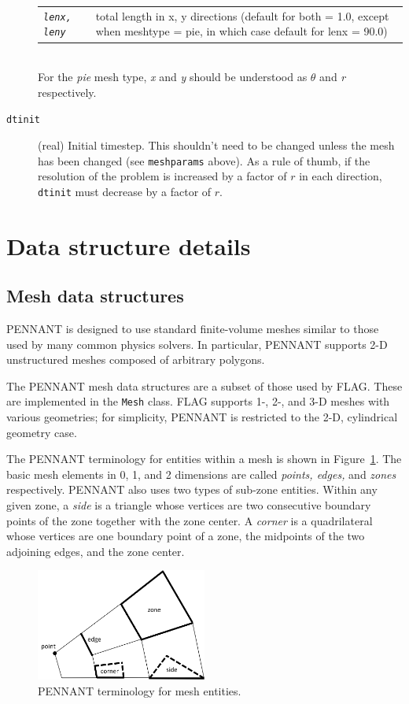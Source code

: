 \documentclass[11pt,letterpaper]{article}
\begin{document}
\begin{description}
\begin{tabular}{lp{320pt}}
            {\tt\emph{lenx, leny}} &
            total length in x, y directions
            (default for both = 1.0, except when meshtype = pie,
            in which case default for lenx = 90.0)
        \end{tabular} \\
        For the {\em pie} mesh type, {\em x} and {\em y}
        should be understood as $\theta$ and {\em r} respectively.
    \item[{\tt dtinit}]  (real) Initial timestep.  This shouldn't need to be
        changed unless the mesh has been changed (see
        {\tt meshparams} above).  As a rule of thumb, if the resolution
        of the problem is increased by a factor of $r$ in each direction,
        {\tt dtinit} must decrease by a factor of $r$.
\end{description}


\section{Data structure details}

\subsection{Mesh data structures}

PENNANT is designed to use standard finite-volume meshes similar to
those used by many common physics solvers.  In particular, PENNANT
supports 2-D unstructured meshes composed of arbitrary polygons.

The PENNANT mesh data structures are a subset of those used by FLAG.
These are implemented in the {\tt Mesh} class.
FLAG supports 1-, 2-, and 3-D meshes with various geometries; for
simplicity, PENNANT is restricted to the 2-D, cylindrical geometry
case.

The PENNANT terminology for entities within a mesh is shown in
Figure~\ref{fig:mesh}.  The basic mesh elements in 0, 1, and 2 dimensions
are called {\em points, edges,} and {\em zones} respectively.
PENNANT also uses two types of sub-zone entities.  Within any given
zone, a {\em side} is a triangle whose vertices are two consecutive
boundary points of the zone together with the zone center.  A {\em corner}
is a quadrilateral whose vertices are one boundary point of a zone,
the midpoints of the two adjoining edges, and the zone center.

\begin{figure}
    \centering
    \includegraphics[width=0.50\textwidth]{mesh-entities.png}
    \caption{PENNANT terminology for mesh entities.}
    \label{fig:mesh}
\end{figure}
\end{document}
